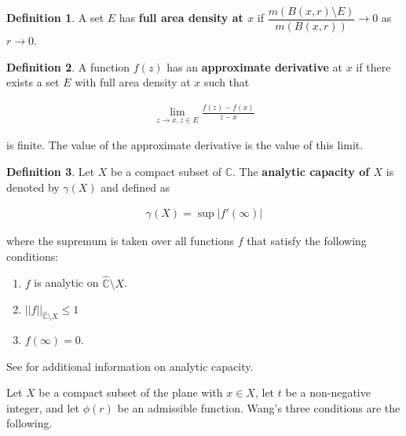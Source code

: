 \documentclass{article}
\theoremstyle{definition}
\newtheorem{definition}{Definition}
\begin{document}
\begin{definition}
A set $E$ has \textbf{full area density at $x$} if $\dfrac{m(B(x,r) \setminus E)}{m(B(x,r))} \to 0$ as $r \to 0$.
\end{definition}

\begin{definition}
    A function $f(z)$ has an \textbf{approximate derivative} at $x$ if there exists a set $E$ with full area density at $x$ such that 

\begin{align*}
    \lim_{z\to x, z\in E} \frac{f(z)-f(x)}{z-x}
\end{align*}

\noindent is finite. The value of the approximate derivative is the value of this limit.
\end{definition}

\begin{definition}
    Let $X$ be a compact subset of $\mathbb C$. The \textbf{analytic capacity of $X$} is denoted by $\gamma(X)$ and defined as


\begin{align*}
    \gamma(X) = \sup |f'(\infty)|
\end{align*}

\noindent where the supremum is taken over all functions $f$ that satisfy the following conditions:

\begin{enumerate}
    \item $f$ is analytic on $\hat{\mathbb C} \setminus X$.
    \item $||f||_{\hat{\mathbb C} \setminus X} \leq 1$
    \item $f(\infty) = 0$.
\end{enumerate}
\end{definition} 

\noindent See \cite[pg. 196]{Gamelin} for additional information on analytic capacity. 


Let $X$ be a compact subset of the plane with $x \in X$, let $t$ be a non-negative integer, and let $\phi(r)$ be an admissible function. Wang's three conditions are the following.
\end{document}
